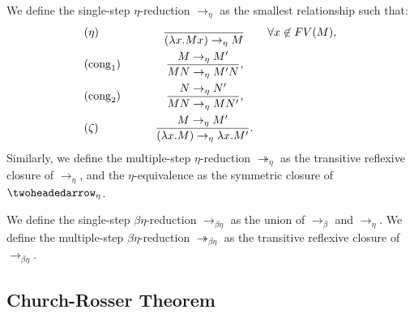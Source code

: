\begin{definition}
We define the single-step $\eta$-reduction $\to_\eta$ as the smallest relationship such that: 
  \begin{align*}
    &(\eta) \qquad\qquad \ \ \ \  \ {\ \over(\lambda x.Mx) \to_\eta M} \qquad \forall x \not  \in FV(M),\\
    &(\operatorname{cong}_1)\qquad\qquad{ M \to_\eta M' \over MN \to_\eta M'N },\\
    &(\operatorname{cong}_2)\qquad\qquad{ N \to_\eta N' \over MN \to_\eta MN' },\\
    &(\zeta) \qquad\qquad \ \  \ {M\to_\eta M' \over(\lambda x.M) \to_\eta \lambda x.M'}.\\
  \end{align*}
  Similarly, we define the multiple-step $\eta$-reduction $\twoheadrightarrow_\eta$ as the transitive reflexive closure of $\to_\eta$, and the $\eta$-equivalence as the symmetric closure of $\twoheadedarrow_\eta$.
\end{definition}
\begin{definition}
  We define the single-step $\beta\eta$-reduction $\to_{\beta\eta}$ as the union of $\to_\beta$ and $\to_\eta$.  We define the multiple-step $\beta\eta$-reduction $\twoheadrightarrow_{\beta\eta}$ as the transitive reflexive closure of $\to_{\beta\eta}$.
\end{definition}




\subsection{Church-Rosser Theorem}

